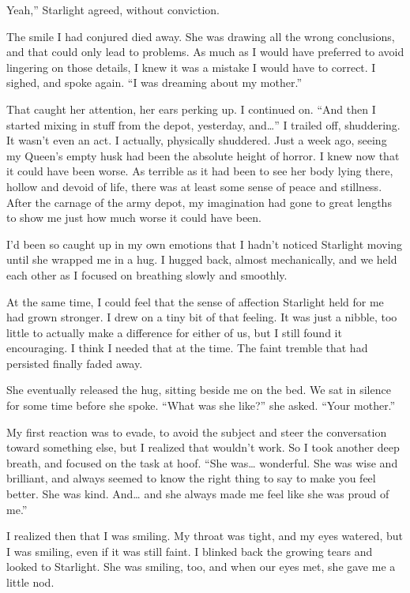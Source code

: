\leavevmode{}Yeah,” Starlight agreed, without conviction.

The smile I had conjured died away. She was drawing all the wrong conclusions, and that could only lead to problems. As much as I would have preferred to avoid lingering on those details, I knew it was a mistake I would have to correct. I sighed, and spoke again. “I was dreaming about my mother.”

That caught her attention, her ears perking up. I continued on. “And then I started mixing in stuff from the depot, yesterday, and…” I trailed off, shuddering. It wasn’t even an act. I actually, physically shuddered. Just a week ago, seeing my Queen’s empty husk had been the absolute height of horror. I knew now that it could have been worse. As terrible as it had been to see her body lying there, hollow and devoid of life, there was at least some sense of peace and stillness. After the carnage of the army depot, my imagination had gone to great lengths to show me just how much worse it could have been.

I’d been so caught up in my own emotions that I hadn’t noticed Starlight moving until she wrapped me in a hug. I hugged back, almost mechanically, and we held each other as I focused on breathing slowly and smoothly.

At the same time, I could feel that the sense of affection Starlight held for me had grown stronger. I drew on a tiny bit of that feeling. It was just a nibble, too little to actually make a difference for either of us, but I still found it encouraging. I think I needed that at the time. The faint tremble that had persisted finally faded away.

She eventually released the hug, sitting beside me on the bed. We sat in silence for some time before she spoke. “What was she like?” she asked. “Your mother.”

My first reaction was to evade, to avoid the subject and steer the conversation toward something else, but I realized that wouldn’t work. So I took another deep breath, and focused on the task at hoof. “She was… wonderful. She was wise and brilliant, and always seemed to know the right thing to say to make you feel better. She was kind. And… and she always made me feel like she was proud of me.”

I realized then that I was smiling. My throat was tight, and my eyes watered, but I was smiling, even if it was still faint. I blinked back the growing tears and looked to Starlight. She was smiling, too, and when our eyes met, she gave me a little nod.

